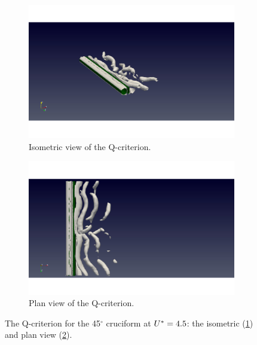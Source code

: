 \documentclass[oneside]{utmthesis}
\begin{document}
\begin{figure}[H]
  \centering
  \begin{subfigure}[h]{0.48\textwidth}
    \includegraphics[width=\textwidth,trim={1.5cm 0 3cm 0},clip]{figs/qIso000U02}
    \caption{Isometric view of the Q-criterion.}
    \label{fig:qIso000U02}
  \end{subfigure}
  \hfill
  \begin{subfigure}[h]{0.48\textwidth}
    \includegraphics[width=\textwidth,trim={1.5cm 0 3cm 0},clip]{figs/qTop000U02}
    \caption{Plan view of the Q-criterion.}
    \label{fig:qTop000U02}
  \end{subfigure}

  \caption{The Q-criterion for the 45$^{\circ}$ cruciform at $U^{*} = 4.5$: the isometric (\ref{fig:qIso000U02}) and plan view (\ref{fig:qTop000U02}).} \label{fig:qCrit000U02}
\end{figure}
\end{document}
